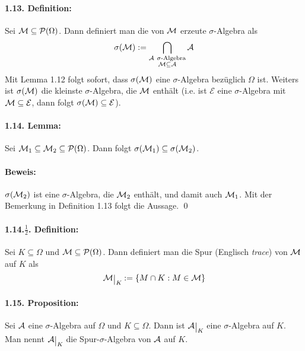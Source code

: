 \documentclass[12pt]{report}
\begin{document}
\paragraph{1.13. Definition:} Sei $\mathcal{M}\subseteq\mathcal{P}(\Omega)$. Dann definiert man die von $\mathcal{M}$ erzeute $\sigma$-Algebra als
$$\sigma(\M):=\bigcap_{\substack{\A\ \sigma\text{-Algebra}\\\M\subseteq\A}}\A$$
Mit Lemma 1.12 folgt sofort, dass $\sigma(\mathcal{M})$ eine $\sigma$-Algebra bez\"uglich $\Omega$ ist. Weiters ist $\sigma(\mathcal{M})$ die kleinste $\sigma$-Algebra, die $\mathcal{M}$ enth\"alt (i.e. ist $\mathcal{E}$ eine $\sigma$-Algebra mit $\mathcal{M}\subseteq\mathcal{E}$, dann folgt $\sigma(\mathcal{M})\subseteq\mathcal{E}$). 

\paragraph{1.14. Lemma:}Sei $\mathcal{M}_1\subseteq\mathcal{M}_2\subseteq\mathcal{P}(\Omega)$. Dann folgt $\sigma(\mathcal{M}_1)\subseteq\sigma(\mathcal{M}_2)$.

\paragraph{Beweis:}$\sigma(\mathcal{M}_2)$ ist eine $\sigma$-Algebra, die $\mathcal{M}_2$ enth\"alt, und damit auch $\mathcal{M}_1$. Mit der Bemerkung in Definition 1.13 folgt die Aussage. \qed

\paragraph{1.14.$\frac{1}{2}$. Definition:}Sei $K\subseteq\Omega$ und $\mathcal{M}\subseteq\mathcal{P}(\Omega)$. Dann definiert man die Spur (Englisch \textit{trace}) von $\mathcal{M}$ auf $K$ als
$$\M\krestr{K}:=\{M\cap K:M\in\M\}$$

\paragraph{1.15. Proposition:} Sei $\mathcal{A}$ eine $\sigma$-Algebra auf $\Omega$ und $K\subseteq\Omega$. Dann ist $\A\krestr{K}$ eine $\sigma$-Algebra auf $K$. Man nennt $\A\krestr{K}$ die Spur-$\sigma$-Algebra von $\mathcal{A}$ auf $K$. 
\end{document}
